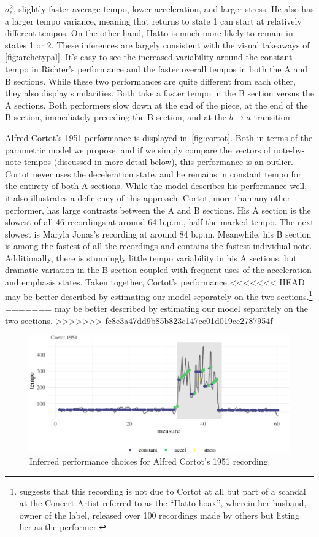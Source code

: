 \documentclass[aoas]{imsart}
\begin{document}
$\sigma^2_{\epsilon}$, slightly faster average tempo, lower
acceleration, and larger stress. He also has a larger tempo variance,
meaning that returns to state 1 can start at relatively different
tempos. On the other hand, Hatto is much more
likely to remain in states 1 or 2. These inferences are largely
consistent with the visual takeaways of \autoref{fig:archetypal}. It's
easy to see the increased variability around the constant tempo in
Richter's performance and the faster overall tempos in both the A and
B sections.
%
While these two performances are quite different from each other, they
also display similarities. Both take a faster tempo in the B
section versus the A sections. Both performers slow down at the end of
the piece, at the end of the B section, immediately preceding the B section, and at the
$b\rightarrow a$ transition.

Alfred Cortot's 1951 performance is displayed
in~\autoref{fig:cortot}. Both in terms of the parametric model we
propose, and if we simply compare the vectors of note-by-note tempos
(discussed in more detail below), this performance is an
outlier. Cortot never uses the deceleration state, and he remains in
constant tempo for the entirety of both A sections. While the model
describes his performance well, it also illustrates a deficiency of
this approach: Cortot, more than any other performer, has large
contrasts between the A and B sections. His A section is the slowest
of all 46 recordings at around 64 b.p.m., half the marked
tempo. The next slowest is Maryla Jonas's recording at around 84
b.p.m. Meanwhile, his B section is among the fastest of all the
recordings and contains the fastest individual note. Additionally,
there is stunningly little tempo variability in his A sections, but
dramatic variation in the B section coupled with frequent uses of the
acceleration and emphasis states. Taken together, Cortot's performance
<<<<<<< HEAD
may be better described by estimating our model separately on the two
sections.\footnote{\citet{Cook2013} suggests that this recording is not
  due to Cortot at all but part of a scandal at the Concert Artist
  referred to as the ``Hatto hoax'', wherein her husband, owner of the
  label, released over 100 recordings made by others but listing her
  as the performer.}
=======
may be better described by estimating our model separately on the two sections.
>>>>>>> fc8e3a47dd9b85b823c147ce01d019ce2787954f
\begin{figure}[t]
  \centering
    \includegraphics[width=.9\textwidth]{cortot-performance-1}
  \caption{Inferred performance choices for Alfred Cortot's 1951
    recording.}
  \label{fig:cortot}
\end{figure}
\end{document}

